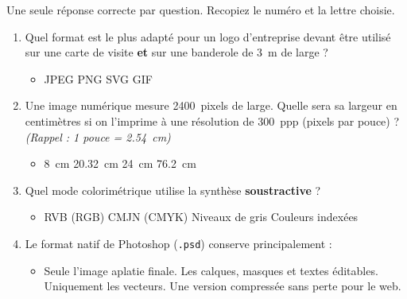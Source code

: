 \documentclass[11pt]{article}
\begin{document}
\begin{exercice}
Une seule réponse correcte par question. Recopiez le numéro et la lettre choisie.
\begin{enumerate}
    \item Quel format est le plus adapté pour un logo d'entreprise devant être utilisé sur une carte de visite \textbf{et} sur une banderole de \SI{3}{m} de large ?
    \begin{itemize}
        \item[A)] JPEG \quad [B)] PNG \quad [C)] SVG \quad [D)] GIF
    \end{itemize}
    \item Une image numérique mesure \SI{2400}{pixels} de large. Quelle sera sa largeur en centimètres si on l'imprime à une résolution de \SI{300}{ppp} (pixels par pouce) ? \textit{(Rappel : 1 pouce = \SI{2,54}{cm})}
    \begin{itemize}
        \item[A)] \SI{8}{cm} \quad [B)] \SI{20,32}{cm} \quad [C)] \SI{24}{cm} \quad [D)] \SI{76,2}{cm}
    \end{itemize}
    \item Quel mode colorimétrique utilise la synthèse \textbf{soustractive} ?
    \begin{itemize}
        \item[A)] RVB (RGB) \quad [B)] CMJN (CMYK) \quad [C)] Niveaux de gris \quad [D)] Couleurs indexées
    \end{itemize}
    \item Le format natif de Photoshop (\texttt{.psd}) conserve principalement :
    \begin{itemize}
        \item[A)] Seule l'image aplatie finale. \quad [B)] Les calques, masques et textes éditables. \quad [C)] Uniquement les vecteurs. \quad [D)] Une version compressée sans perte pour le web.
    \end{itemize}
\end{enumerate}
\end{exercice}
\end{document}
